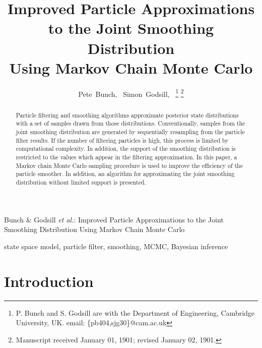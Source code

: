 \documentclass[journal]{IEEEtran}
\begin{document}
\title{Improved Particle Approximations \\ to the Joint Smoothing Distribution \\ Using Markov Chain Monte Carlo}

\author{Pete~Bunch,~\IEEEmembership{}
        Simon~Godsill,~%
\thanks{P. Bunch and S. Godsill are with the Department
of Engineering, Cambridge University, UK. email: \{pb404,sjg30\}@cam.ac.uk}%
\thanks{Manuscript received January 01, 1901; revised January 02, 1901.}}

%
{Bunch \& Godsill \MakeLowercase{\textit{et al.}}: Improved Particle Approximations to the Joint Smoothing Distribution Using Markov Chain Monte Carlo}

\maketitle


\begin{abstract}
Particle filtering and smoothing algorithms approximate posterior state distributions with a set of samples drawn from those distributions. Conventionally, samples from the joint smoothing distribution are generated by sequentially resampling from the particle filter results. If the number of filtering particles is high, this process is limited by computational complexity. In addition, the support of the smoothing distribution is restricted to the values which appear in the filtering approximation. In this paper, a Markov chain Monte Carlo sampling procedure is used to improve the efficiency of the particle smoother. In addition, an algorithm for approximating the joint smoothing distribution without limited support is presented.
\end{abstract}



\begin{IEEEkeywords}
state space model, particle filter, smoothing, MCMC, Bayesian inference
\end{IEEEkeywords}



\section{Introduction} \label{sec:intro}
\end{document}
